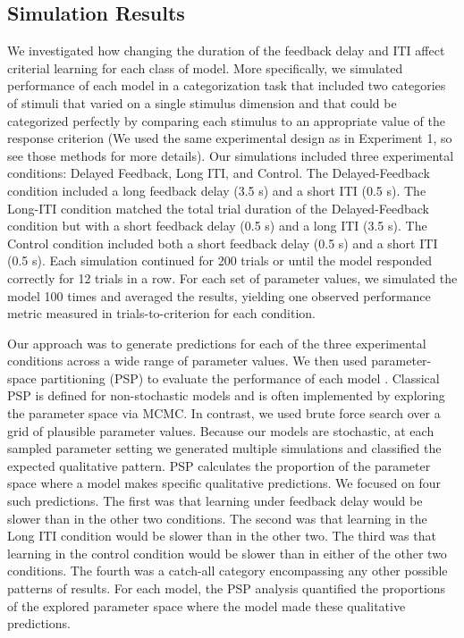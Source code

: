 \documentclass[doc, floatsintext]{apa7}
\begin{document}
\subsection{Simulation Results}
We investigated how changing the duration of the feedback
delay and ITI affect criterial learning for each class of
model. More specifically, we simulated performance of
each model in a categorization task that included two
categories of stimuli that varied on a single stimulus
dimension and that could be categorized perfectly by
comparing each stimulus to an appropriate value of the
response criterion (We used the same experimental design as
in Experiment 1, so see those methods for more details). Our
simulations included three experimental conditions: Delayed
Feedback, Long ITI, and Control. The Delayed-Feedback
condition included a long feedback delay (3.5 s) and a short
ITI (0.5 s). The Long-ITI condition matched the total trial
duration of the Delayed-Feedback condition but with a short
feedback delay (0.5 s) and a long ITI (3.5 s). The Control
condition included both a short feedback delay (0.5 s) and a
short ITI (0.5 s). Each simulation continued for 200 trials
or until the model responded correctly for 12 trials in a
row. For each set of parameter values, we simulated the
model 100 times and averaged the results, yielding one
observed performance metric measured in trials-to-criterion
for each condition. 

Our approach was to generate predictions for each of the
three experimental conditions across a wide range of
parameter values. We then used parameter-space partitioning
(PSP) to evaluate the performance of each model
\parencite[PSP;][]{pitt2006global}.  Classical PSP is
defined for non-stochastic models and is often implemented
by exploring the parameter space via MCMC.  In contrast, we
used brute force search over a grid of plausible parameter
values. Because our models are stochastic, at each sampled
parameter setting we generated multiple simulations and
classified the expected qualitative pattern.  PSP calculates
the proportion of the parameter space where a model makes
specific qualitative predictions. We focused on four such
predictions. The first was that learning under feedback
delay would be slower than in the other two conditions. The
second was that learning in the Long ITI condition would be
slower than in the other two. The third was that learning in
the control condition would be slower than in either of the
other two conditions. The fourth was a catch-all category
encompassing any other possible patterns of results. For
each model, the PSP analysis quantified the proportions of
the explored parameter space where the model made these
qualitative predictions.
\end{document}
